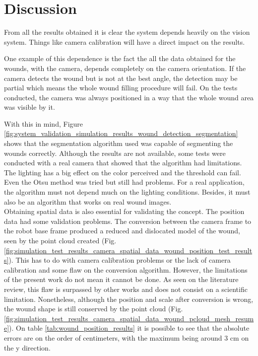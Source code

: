 


\clearpage

\section{Discussion}
\label{sec:system_validation_discussion}

From all the results obtained it is clear the system depends heavily on the vision system. Things like camera calibration will have a direct impact on the results.

One example of this dependence is the fact the all the data obtained for the wounds, with the camera, depends completely on the camera orientation. If the camera detects the wound but is not at the best angle, the detection may be partial which means the whole wound filling procedure will fail. On the tests conducted, the camera was always positioned in a way that the whole wound area was visible by it.

With this in mind, Figure \ref{fig:system_validation_simulation_results_wound_detection_segmentation} shows that the segmentation algorithm used was capable of segmenting the wounds correctly. Although the results are not available, some tests were conducted with a real camera that showed that the algorithm had limitations. The lighting has a big effect on the color perceived and the threshold can fail. Even the Otsu method was tried but still had problems. For a real application, the algorithm must not depend much on the lighting conditions. Besides, it must also be an algorithm that works on real wound images.\\

Obtaining spatial data is also essential for validating the concept. The position data had some validation problems. The conversion between the camera frame to the robot base frame produced a reduced and dislocated model of the wound, seen by the point cloud created (Fig. \ref{fig:simulation_test_results_camera_spatial_data_wound_position_test_results}). This has to do with camera calibration problems or the lack of camera calibration and some flaw on the conversion algorithm. However, the limitations of the present work do not mean it cannot be done. As seen on the literature review, this flaw is surpassed by other works and does not consist on a scientific limitation. Nonetheless, although the position and scale after conversion is wrong, the wound shape is still conserved by the point cloud (Fig. \ref{fig:simulation_test_results_camera_spatial_data_wound_pcloud_mesh_resume}). On table \ref{tab:wound_position_results} it is possible to see that the absolute errors are on the order of centimeters, with the maximum being around 3 cm on the y direction.

